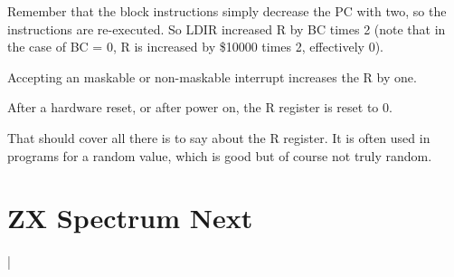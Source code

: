 \documentclass[12pt,twoside,openright,a4paper]{book}
\newcommand{\notet}{\rule{0pt}{2.4ex}}
\begin{document}
Remember that the block instructions simply decrease the PC with two, so the instructions are re-executed. So LDIR increased R by BC times 2 (note that in the case of BC = 0, R is increased by \$10000 times 2, effectively 0).

Accepting an maskable or non-maskable interrupt increases the R by one.

After a hardware reset, or after power on, the R register is reset to 0.

That should cover all there is to say about the R register. It is often used in programs for a random value, which is good but of course not truly random.




\chapter{ZX Spectrum Next}

\environbodyname\NEXTPORTBODY
{}
\newcommand{\PortBits}[1]{\tt #1\notet &}
\newcommand{\PortDesc}[1]{#1 \\}
\newcommand{\PortDescOnly}[1]{& \PortDesc{#1}}
\newcommand{\PortLink}[2]{{\small \textbf{#1} {\tt \$#2}}}

\environbodyname\PORTBITTABLEBODY
{}
\newcommand{\PortConfig}[2]{{\tt #1} & \PortDesc{#2}}

\newcommand{\BitHead}[1]{\footnotesize \textbf{#1}}
\newcommand{\BitMono}[1]{\tt #1}
\newcommand{\BitSmall}[1]{\small #1}|
\newcommand{\BitMulti}[2]{\multicolumn{#1}{c|}{#2}}
\newcommand{\BitStartMulti}[2]{\multicolumn{#1}{|c|}{#2}}
\end{document}
